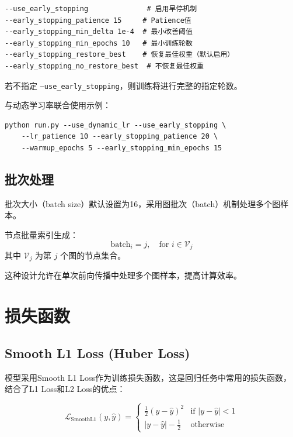 \begin{verbatim}
--use_early_stopping              # 启用早停机制
--early_stopping_patience 15     # Patience值
--early_stopping_min_delta 1e-4  # 最小改善阈值
--early_stopping_min_epochs 10   # 最小训练轮数
--early_stopping_restore_best    # 恢复最佳权重（默认启用）
--early_stopping_no_restore_best  # 不恢复最佳权重
\end{verbatim}

若不指定 \texttt{--use\_early\_stopping}，则训练将进行完整的指定轮数。

与动态学习率联合使用示例：

\begin{verbatim}
python run.py --use_dynamic_lr --use_early_stopping \
    --lr_patience 10 --early_stopping_patience 20 \
    --warmup_epochs 5 --early_stopping_min_epochs 15
\end{verbatim}

\subsection{批次处理}

批次大小（batch size）默认设置为16，采用图批次（batch）机制处理多个图样本。

节点批量索引生成：
\begin{equation}
\text{batch}_i = j, \quad \text{for } i \in \mathcal{V}_j
\end{equation}
其中 $\mathcal{V}_j$ 为第 $j$ 个图的节点集合。

这种设计允许在单次前向传播中处理多个图样本，提高计算效率。

\newpage

\section{损失函数}

\subsection{Smooth L1 Loss (Huber Loss)}

模型采用Smooth L1 Loss作为训练损失函数，这是回归任务中常用的损失函数，结合了L1 Loss和L2 Loss的优点：

\begin{equation}
\mathcal{L}_{\text{SmoothL1}}(y, \hat{y}) = \begin{cases}
\frac{1}{2} (y - \hat{y})^2 & \text{if } |y - \hat{y}| < 1 \\
|y - \hat{y}| - \frac{1}{2} & \text{otherwise}
\end{cases}
\end{equation}

